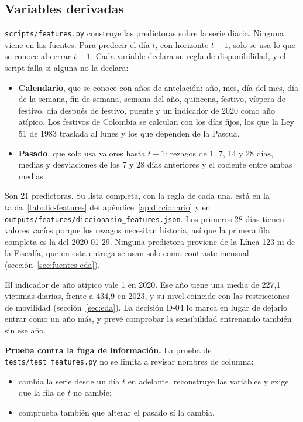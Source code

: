 \subsection{Variables derivadas}\label{sec:variables}

\texttt{scripts/features.py} construye las predictoras sobre la serie diaria. Ninguna viene en las fuentes. Para predecir el día $t$, con horizonte $t+1$, solo se usa lo que se conoce al cerrar $t-1$. Cada variable declara su regla de disponibilidad, y el script falla si alguna no la declara:
\begin{itemize}
  \item \textbf{Calendario}, que se conoce con años de antelación: año, mes, día del mes, día de la semana, fin de semana, semana del año, quincena, festivo, víspera de festivo, día después de festivo, puente y un indicador de 2020 como año atípico. Los festivos de Colombia se calculan con los días fijos, los que la Ley 51 de 1983 traslada al lunes y los que dependen de la Pascua.
  \item \textbf{Pasado}, que solo usa valores hasta $t-1$: rezagos de 1, 7, 14 y 28 días, medias y desviaciones de los 7 y 28 días anteriores y el cociente entre ambas medias.
\end{itemize}

Son 21 predictoras. Su lista completa, con la regla de cada una, está en la tabla~\ref{tab:dic-features} del apéndice~\ref{ap:diccionario} y en \texttt{outputs/features/diccionario\_features.json}. Los primeros 28 días tienen valores vacíos porque los rezagos necesitan historia, así que la primera fila completa es la del 2020-01-29. Ninguna predictora proviene de la Línea 123 ni de la Fiscalía, que en esta entrega se usan solo como contraste mensual (sección~\ref{sec:fuentes-eda}).

El indicador de año atípico vale 1 en 2020. Ese año tiene una media de 227,1 víctimas diarias, frente a 434,9 en 2023, y su nivel coincide con las restricciones de movilidad (sección~\ref{sec:eda}). La decisión D-04 lo marca en lugar de dejarlo entrar como un año más, y prevé comprobar la sensibilidad entrenando también sin ese año.

\textbf{Prueba contra la fuga de información.} La prueba de \texttt{tests/\allowbreak{}test\_\allowbreak{}features.py} no se limita a revisar nombres de columna:
\begin{itemize}
  \item cambia la serie desde un día $t$ en adelante, reconstruye las variables y exige que la fila de $t$ no cambie;
  \item comprueba también que alterar el pasado sí la cambia.
\end{itemize}

